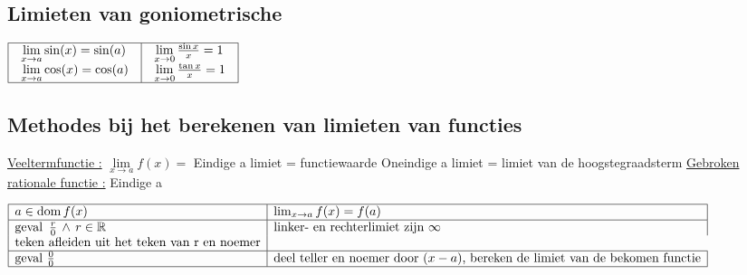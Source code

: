 \documentclass[a5paper]{article}
\begin{document}
\subsection{Limieten van goniometrische}

$\begin{array}{|l|l|}
\hline
\begin{array}{l}
\mathop {\lim }\limits_{x \to a} \sin (x) = \sin (a)\\
\mathop {\lim }\limits_{x \to a} \cos (x) = \cos (a)
\end{array}
&
\begin{array}{l}
\mathop {\lim }\limits_{x \to 0} \frac{{\sin x}}{x} = 1\\
\mathop {\lim }\limits_{x \to 0} \frac{{\tan x}}{x} = 1
\end{array} \\
\hline
\end{array}$
\normalsize

\newpage

\subsection{Methodes bij het berekenen van limieten van functies}
\underline{Veeltermfunctie :} $\mathop {\lim }\limits_{x \to a} f\left( x \right) = $ \newline
Eindige a	limiet = functiewaarde \newline
Oneindige a	limiet = limiet van de hoogstegraadsterm \newline
\underline{Gebroken rationale functie :} \newline
Eindige a \newline

$
\begin{array}{|l|l|}
\hline
a \in \text{dom}\, f(x) & \lim_{x \to a} f(x) = f(a) \\
\hline
\text{geval }\, \frac{r}{0}\, \wedge \,r \in \mathbb{R} & \text{linker- en rechterlimiet zijn }\infty \\ \text{teken afleiden uit het teken van r en noemer} \\
\hline
\text{geval } \frac{0}{0} & \text{deel teller en noemer door } (x-a) \text{, bereken de limiet van de bekomen functie} \\
\hline
\end{array}
$

\newpage
\end{document}
